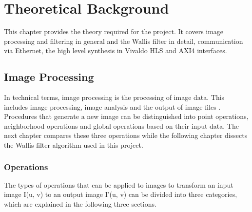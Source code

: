%
%
\chapter{Theoretical Background} \label{chapt:theoreticalback}
This chapter provides the theory required for the project. 
It covers image processing and filtering in general and the Wallis filter in
detail, communication via Ethernet,  the high level synthesis in Vivaldo HLS and 
AXI4 interfaces.

%
%
\section{Image Processing} \label{chapt:theory:imageprocessing}
In technical terms, image processing is the processing of image data. This
includes image processing, image analysis and the output of image files 
\cite{image_processing}. Procedures that generate a new image can be
distinguished into point operations, neighborhood operations and global
operations based on their input data. The next chapter compares these three
operations while the following chapter dissects the Wallis filter algorithm used
in this project.

\subsection{Operations}
The types of operations that can be applied to images to transform an input image I(u, v) to an output image I'(u, v) can be divided into three categories, which are explained in the following three sections.

